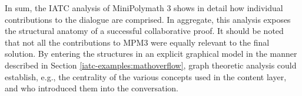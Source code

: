 \documentclass[smallextended,oneside]{svjour3}       %
\newcommand\nothing[1]{#1}
\let\paragraph\nothing
\begin{document}
\paragraph{In sum, the IATC analysis of MiniPolymath 3 shows in detail how individual contributions to the dialogue are comprised.}
In aggregate, this analysis exposes the structural anatomy of a successful collaborative proof.
It should be noted that not all the contributions to MPM3 were equally relevant to the final solution.   By entering the structures in an explicit graphical model in the manner described in Section \ref{iatc-examples:mathoverflow}, graph theoretic analysis could establish, e.g., the centrality of the various concepts used in the content layer, and who introduced them into the conversation.  

\FloatBarrier
\end{document}
